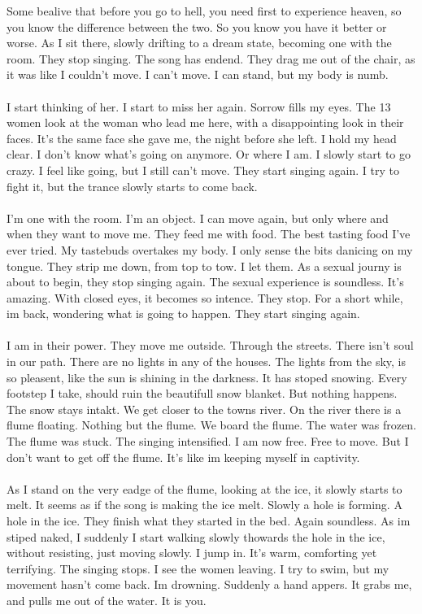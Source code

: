 \documentclass[]{article}
\begin{document}
Some bealive that before you go to hell, you need first to experience heaven, so you know the difference between the two. So you know you have it better or worse. As I sit there, slowly drifting to a dream state, becoming one with the room. They stop singing. The song has endend. They drag me out of the chair, as it was like I couldn't move. I can't move. I can stand, but my body is numb. 
\\ \\
I start thinking of her. I start to miss her again. Sorrow fills my eyes. The 13 women look at the woman who lead me here, with a disappointing look in their faces. It's the same face she gave me, the night before she left. I hold my head clear. I don't know what's going on anymore. Or where I am. I slowly start to go crazy. I feel like going, but I still can't move. They start singing again. I try to fight it, but the trance slowly starts to come back. 
\\ \\
I'm one with the room. I'm an object. I can move again, but only where and when they want to move me. They feed me with food. The best tasting food I've ever tried. My tastebuds overtakes my body. I only sense the bits danicing on my tongue. They strip me down, from top to tow. I let them. As a sexual journy is about to begin, they stop singing again. The sexual experience is soundless. It's amazing. With closed eyes, it becomes so intence. They stop. For a short while, im back, wondering what is going to happen. They start singing again. 
\\ \\
I am in their power. They move me outside. Through the streets. There isn't soul in our path. There are no lights in any of the houses. The lights from the sky, is so pleasent, like the sun is shining in the darkness. It has stoped snowing. Every footstep I take, should ruin the beautifull snow blanket. But nothing happens. The snow stays intakt. We get closer to the towns river. On the river there is a flume floating. Nothing but the flume. We board the flume. The water was frozen. The flume was stuck. The singing intensified. I am now free. Free to move. But I don't want to get off the flume. It's like im keeping myself in captivity. 
\\ \\
As I stand on the very eadge of the flume, looking at the ice, it slowly starts to melt. It seems as if the song is making the ice melt. Slowly a hole is forming. A hole in the ice. They finish what they started in the bed. Again soundless. As im stiped naked, I suddenly I start walking slowly thowards the hole in the ice, without resisting, just moving slowly. I jump in. It's warm, comforting yet terrifying. The singing stops. I see the women leaving. I try to swim, but my movement hasn't come back. Im drowning. Suddenly a hand appers. It grabs me, and pulls me out of the water. It is you.
\end{document}

